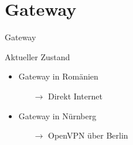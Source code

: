 \section{Gateway}


\begin{frame}{Gateway}
    \begin{block}{Aktueller Zustand}
        \begin{itemize}
            \item Gateway in Romänien
            \begin{itemize}
                \item[$\rightarrow$] Direkt Internet
            \end{itemize}
            \item Gateway in Nürnberg
            \begin{itemize}
                \item[$\rightarrow$] OpenVPN über Berlin
            \end{itemize}
        \end{itemize}
    \end{block}
\end{frame}
